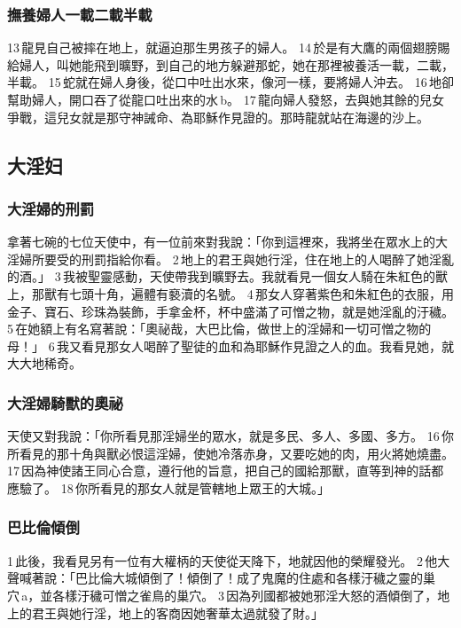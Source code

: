 \subsubsection{撫養婦人一載二載半載}

13 龍見自己被摔在地上，就逼迫那生男孩子的婦人。 14 於是有大鷹的兩個翅膀賜給婦人，叫她能飛到曠野，到自己的地方躲避那蛇，她在那裡被養活一載，二載，半載。 15 蛇就在婦人身後，從口中吐出水來，像河一樣，要將婦人沖去。 16 地卻幫助婦人，開口吞了從龍口吐出來的水 b。 17 龍向婦人發怒，去與她其餘的兒女爭戰，這兒女就是那守神誡命、為耶穌作見證的。那時龍就站在海邊的沙上。

\subsection{大淫妇}
\subsubsection{大淫婦的刑罰 }
拿著七碗的七位天使中，有一位前來對我說：「你到這裡來，我將坐在眾水上的大淫婦所要受的刑罰指給你看。 2 地上的君王與她行淫，住在地上的人喝醉了她淫亂的酒。」 3 我被聖靈感動，天使帶我到曠野去。我就看見一個女人騎在朱紅色的獸上，那獸有七頭十角，遍體有褻瀆的名號。 4 那女人穿著紫色和朱紅色的衣服，用金子、寶石、珍珠為裝飾，手拿金杯，杯中盛滿了可憎之物，就是她淫亂的汙穢。 5 在她額上有名寫著說：「奧祕哉，大巴比倫，做世上的淫婦和一切可憎之物的母！」 6 我又看見那女人喝醉了聖徒的血和為耶穌作見證之人的血。我看見她，就大大地稀奇。
\subsubsection{大淫婦騎獸的奧祕}
天使又對我說：「你所看見那淫婦坐的眾水，就是多民、多人、多國、多方。 16 你所看見的那十角與獸必恨這淫婦，使她冷落赤身，又要吃她的肉，用火將她燒盡。 17 因為神使諸王同心合意，遵行他的旨意，把自己的國給那獸，直等到神的話都應驗了。 18 你所看見的那女人就是管轄地上眾王的大城。」


\subsubsection{巴比倫傾倒}

1 此後，我看見另有一位有大權柄的天使從天降下，地就因他的榮耀發光。 2 他大聲喊著說：「巴比倫大城傾倒了！傾倒了！成了鬼魔的住處和各樣汙穢之靈的巢穴 a，並各樣汙穢可憎之雀鳥的巢穴。 3 因為列國都被她邪淫大怒的酒傾倒了，地上的君王與她行淫，地上的客商因她奢華太過就發了財。」

